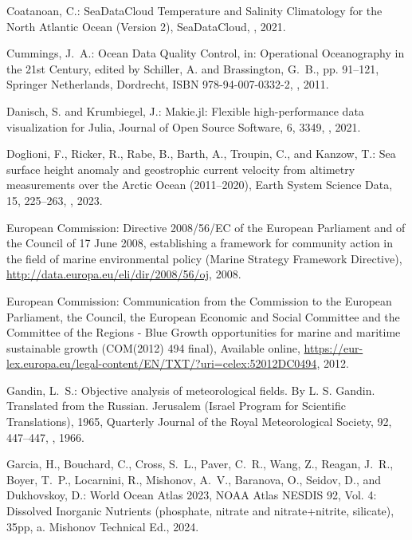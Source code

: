 \documentclass[essd, manuscript]{copernicus}
\begin{document}
\begin{thebibliography}{52}
Coatanoan, C.: SeaDataCloud Temperature and Salinity Climatology for the North
  Atlantic Ocean (Version 2), SeaDataCloud, , 2021.

Cummings, J.~A.: Ocean Data Quality Control, in: Operational Oceanography in
  the 21st Century, edited by Schiller, A. and Brassington, G.~B., pp. 91--121,
  Springer Netherlands, Dordrecht, ISBN 978-94-007-0332-2,
  , 2011.

Danisch, S. and Krumbiegel, J.: {Makie.jl: Flexible high-performance data
  visualization for Julia}, Journal of Open Source Software, 6, 3349,
  , 2021.

Doglioni, F., Ricker, R., Rabe, B., Barth, A., Troupin, C., and Kanzow, T.: Sea
  surface height anomaly and geostrophic current velocity from altimetry
  measurements over the Arctic Ocean (2011–2020), Earth System Science Data,
  15, 225–263, , 2023.

{European Commission}: {Directive 2008/56/EC of the European Parliament and of
  the Council of 17 June 2008, establishing a framework for community action in
  the field of marine environmental policy (Marine Strategy Framework
  Directive)}, \urlprefix\url{http://data.europa.eu/eli/dir/2008/56/oj}, 2008.

{European Commission}: {Communication from the Commission to the European
  Parliament, the Council, the European Economic and Social Committee and the
  Committee of the Regions - Blue Growth opportunities for marine and maritime
  sustainable growth (COM(2012) 494 final)}, Available online,
  \urlprefix\url{https://eur-lex.europa.eu/legal-content/EN/TXT/?uri=celex:52012DC0494},
  2012.

Gandin, L.~S.: {Objective analysis of meteorological fields. By L. S. Gandin.
  Translated from the Russian. Jerusalem (Israel Program for Scientific
  Translations), 1965}, Quarterly Journal of the Royal Meteorological Society,
  92, 447--447, , 1966.

Garcia, H., Bouchard, C., Cross, S.~L., Paver, C.~R., Wang, Z., Reagan, J.~R.,
  Boyer, T.~P., Locarnini, R., Mishonov, A.~V., Baranova, O., Seidov, D., and
  Dukhovskoy, D.: {World Ocean Atlas 2023}, NOAA Atlas NESDIS 92, {Vol. 4}:
  Dissolved Inorganic Nutrients (phosphate, nitrate and nitrate+nitrite,
  silicate), 35pp, a. Mishonov Technical Ed., 2024{}.


\end{thebibliography}
\end{document}
